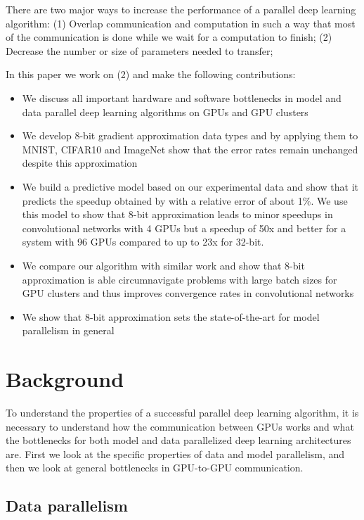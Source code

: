 \documentclass{article} %
\begin{document}
There are two major ways to increase the performance of a parallel deep learning algorithm: (1) Overlap communication and computation in such a way that most of the communication is done while we wait for a computation to finish; (2) Decrease the number or size of parameters needed to transfer;

In this paper we work on (2) and make the following contributions: 
\begin{itemize}
	\item We discuss all important hardware and software bottlenecks in model and data parallel deep learning algorithms on GPUs and GPU clusters
	\item We develop 8-bit gradient approximation data types and by applying them to MNIST, CIFAR10 and ImageNet show that the error rates remain unchanged despite this approximation
	\item We build a predictive model based on our experimental data and show that it predicts the speedup obtained by \citet{krizhevsky2014one} with a relative error of about 1\%. We use this model to show that 8-bit approximation leads to minor speedups in convolutional networks with 4 GPUs but a speedup of 50x and better for a system with 96 GPUs compared to up to 23x for 32-bit.
	\item We compare our algorithm with similar work and show that 8-bit approximation is able circumnavigate problems with large batch sizes for GPU clusters and thus improves convergence rates in convolutional networks
	\item We show that 8-bit approximation sets the state-of-the-art for model parallelism in general
\end{itemize}
\section{Background}

 To understand the properties of a successful parallel deep learning algorithm, it is necessary to understand how the communication between GPUs works and what the bottlenecks for both model and data parallelized deep learning architectures are. First we look at the specific properties of data and model parallelism, and then we look at general bottlenecks in GPU-to-GPU communication.

\subsection{Data parallelism}
\end{document}
